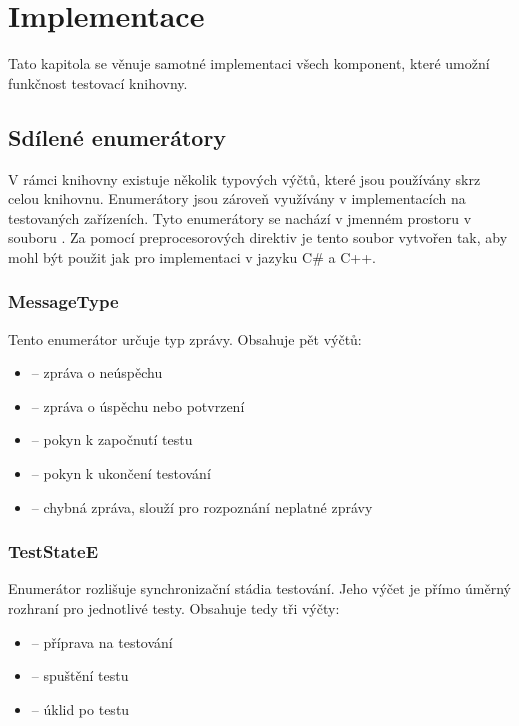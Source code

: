 \chapter{Implementace}

Tato kapitola se věnuje samotné implementaci všech komponent, které umožní funkčnost testovací knihovny.

\section{Sdílené enumerátory}
V rámci knihovny existuje několik typových výčtů, které jsou používány skrz celou knihovnu. Enumerátory jsou zároveň využívány v implementacích na testovaných zařízeních. Tyto enumerátory se nachází v jmenném prostoru  v souboru . Za pomocí preprocesorových direktiv je tento soubor vytvořen tak, aby mohl být použit jak pro implementaci v jazyku C\# a C++. 

\subsection{MessageType}
Tento enumerátor určuje typ zprávy. Obsahuje pět výčtů:

\begin{itemize}
    \item {} -- zpráva o neúspěchu
    \item {} -- zpráva o úspěchu nebo potvrzení
    \item {} -- pokyn k započnutí testu
    \item {} -- pokyn k ukončení testování
    \item {} -- chybná zpráva, slouží pro rozpoznání neplatné zprávy
\end{itemize}

\subsection{TestStateE}
Enumerátor  rozlišuje synchronizační stádia testování. Jeho výčet je přímo úměrný rozhraní pro jednotlivé testy. Obsahuje tedy tři výčty:

\begin{itemize}
    \item {} -- příprava na testování
    \item {} -- spuštění testu
    \item {} -- úklid po testu
\end{itemize}

